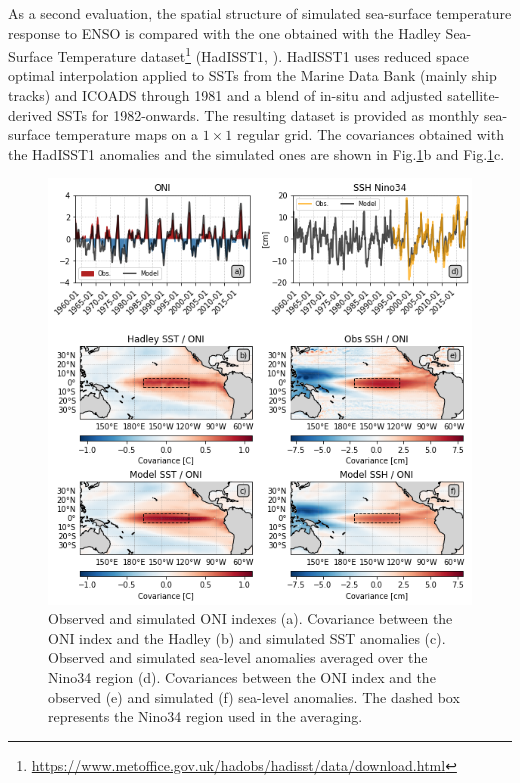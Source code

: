 As a second evaluation, the spatial structure of simulated sea-surface temperature response to ENSO is compared with the one obtained with the Hadley Sea-Surface Temperature dataset\footnote{\url{https://www.metoffice.gov.uk/hadobs/hadisst/data/download.html}} (HadISST1, \citealt{raynerGlobalAnalysesSea2003}). HadISST1 uses reduced space optimal interpolation applied to SSTs from the Marine Data Bank (mainly ship tracks) and ICOADS through 1981 and a blend of in-situ and adjusted satellite-derived SSTs for 1982-onwards. The resulting dataset is provided as monthly sea-surface temperature maps on a $1\times 1$ regular grid. The covariances obtained with the HadISST1 anomalies and the simulated ones are shown in Fig.\ref{fig:nemo-had-sst}b and Fig.\ref{fig:nemo-had-sst}c.

\begin{figure}[htp]
	\centering
	\includegraphics[scale=0.6]{figs/fig1.png}
	\caption{Observed and simulated ONI indexes (a). Covariance between the ONI index and the Hadley (b) and simulated SST anomalies (c). Observed and simulated sea-level anomalies averaged over the Nino34 region (d). Covariances between the ONI index and the observed (e) and simulated (f) sea-level anomalies. The dashed box represents the Nino34 region used in the averaging.}
	\label{fig:nemo-had-sst}
\end{figure}

